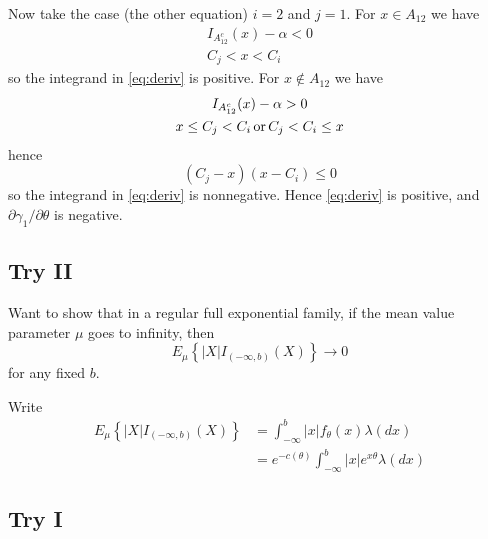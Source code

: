 \documentclass[11pt]{article}
\newcommand{\abs}[1]{\lvert #1 \rvert}
\newcommand{\opor}{\mathop{\rm or}}
\begin{document}
Now take the case (the other equation) $i = 2$ and $j = 1$.
For $x \in A_{1 2}$ we have
\begin{gather*}
   I_{A_{1 2}^c}(x) - \alpha < 0
   \\
   C_j < x < C_i
\end{gather*}
so the integrand in \eqref{eq:deriv} is positive.
For $x \notin A_{1 2}$ we have
\begin{gather*}
   I_{A_{1 2}^c}(x) - \alpha > 0
   \\
   x \le C_j < C_i \opor C_j < C_i \le x
\end{gather*}
hence
$$
   (C_j - x) (x - C_i)  \le 0
$$
so the integrand in \eqref{eq:deriv} is nonnegative.
Hence \eqref{eq:deriv} is positive,
and $\partial \gamma_1 / \partial \theta$ is negative.

\subsection{Try II}

Want to show that in a regular full exponential family, if the mean value
parameter $\mu$ goes to infinity, then
$$
   E_\mu \left\{ \abs{X} I_{(- \infty, b)}(X) \right\} \to 0
$$
for any fixed $b$.

Write
\begin{align*}
   E_\mu \left\{ \abs{X} I_{(- \infty, b)}(X) \right\}
   & =
   \int_{- \infty}^b \abs{x} f_\theta(x) \lambda(d x)
   \\
   & =
   e^{- c(\theta)} \int_{- \infty}^b \abs{x} e^{x \theta} \lambda(d x)
\end{align*}

\subsection{Try I}
\end{document}
